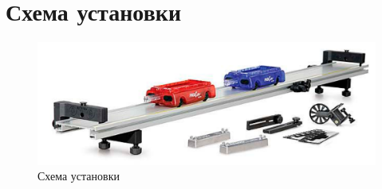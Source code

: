 \section{Схема установки}
\begin{figure}[ht]
    \centering
    \includegraphics[width=\textwidth]{img/scheme.png}
    \caption{Схема установки}
\end{figure}
